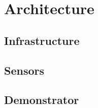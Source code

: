 \documentclass{sigchi}
\begin{document}
\section{Architecture}


\subsection{Infrastructure}




\subsection{Sensors}



\subsection{Demonstrator}

\end{document}
